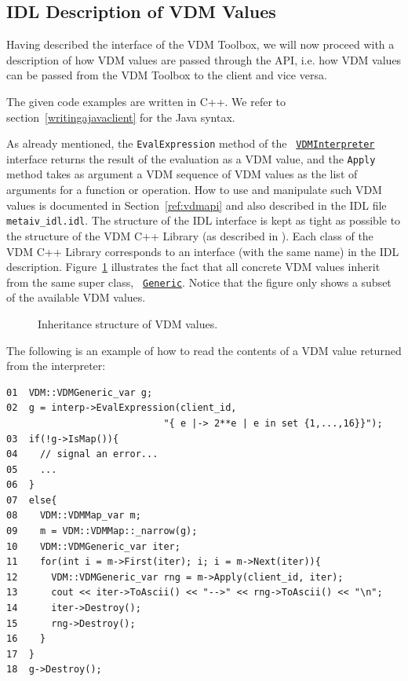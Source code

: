 \documentclass[\pformat,12pt]{article}
\newcommand{\Generic}{\hyperlink{interface.Generic}{Generic}}
\newcommand{\VDMInterpreter}{\hyperlink{interface.VDMInterpreter}{VDMInterpreter}}
\begin{document}
\subsection{IDL Description of VDM Values}
\label{idldescriptionvalues}

Having described the interface of the VDM Toolbox, we will now proceed
with a description of how VDM values are passed through the API,
i.e. how VDM values can be passed from the VDM Toolbox to the client
and vice versa. 

The given code examples are written in C++. We refer to
section~\ref{writingajavaclient} for the Java syntax.

As already mentioned, the {\tt EvalExpression} method of the {\tt
  \VDMInterpreter} interface returns the result of the evaluation as a
VDM value, and the {\tt Apply} method takes as argument a VDM sequence
of VDM values as the list of arguments for a function or operation.
How to use and manipulate such VDM values is documented in Section~\ref{ref:vdmapi}
and also described in the IDL file {\tt metaiv\_idl.idl}. The structure of
the IDL interface is kept as tight as possible to the structure of the
VDM C++ Library (as described in \cite{LibMan-CSK}).  Each class of the
VDM C++ Library corresponds to an interface (with the same name) in
the IDL description. Figure~\ref{fig:VDMvalues} illustrates the fact
that all concrete VDM values inherit from the same super class, {\tt
  \Generic}.  Notice that the figure only shows a subset of the
available VDM values.

\begin{figure}[tbh]
\begin{center}
\mbox{}
\caption{Inheritance structure of VDM values.}\label{fig:VDMvalues}
\end{center}
\end{figure}

The following is an example of how to read the contents of a VDM value
returned from the interpreter: 

\begin{verbatim}
01  VDM::VDMGeneric_var g;
02  g = interp->EvalExpression(client_id, 
                            "{ e |-> 2**e | e in set {1,...,16}}");
03  if(!g->IsMap()){
04    // signal an error...
05    ...
06  }
07  else{
08    VDM::VDMMap_var m;
09    m = VDM::VDMMap::_narrow(g);
10    VDM::VDMGeneric_var iter;
11    for(int i = m->First(iter); i; i = m->Next(iter)){
12      VDM::VDMGeneric_var rng = m->Apply(client_id, iter);
13      cout << iter->ToAscii() << "-->" << rng->ToAscii() << "\n"; 
14      iter->Destroy();
15      rng->Destroy();
16    }
17  }
18  g->Destroy();
\end{verbatim}
\end{document}
